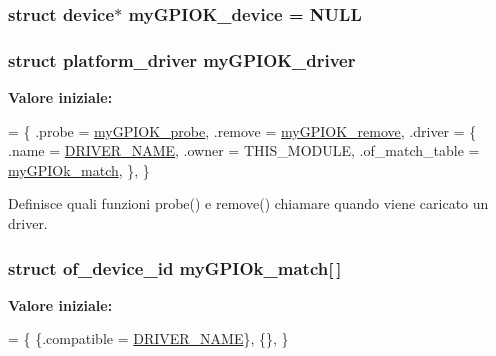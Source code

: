 \hypertarget{group___linux-_driver_ga2d345c792760e3103059b6b6e0bfdaee}{
\subsubsection[{my\+G\+P\+I\+O\+K\+\_\+device}]{\setlength{\rightskip}{0pt plus 5cm}struct device$\ast$ my\+G\+P\+I\+O\+K\+\_\+device = N\+U\+L\+L\hspace{0.3cm}{\ttfamily [static]}}}\label{group___linux-_driver_ga2d345c792760e3103059b6b6e0bfdaee}
\hypertarget{group___linux-_driver_ga8dba1541b58fa63f8208232ffce4fc47}{
\subsubsection[{my\+G\+P\+I\+O\+K\+\_\+driver}]{\setlength{\rightskip}{0pt plus 5cm}struct platform\+\_\+driver my\+G\+P\+I\+O\+K\+\_\+driver\hspace{0.3cm}{\ttfamily [static]}}}\label{group___linux-_driver_ga8dba1541b58fa63f8208232ffce4fc47}
{\bfseries Valore iniziale\+:}
\begin{DoxyCode}
= \{
        .probe = \hyperlink{group___linux-_driver_gae40973a06d72f7c41a9af07513a62307}{myGPIOK\_probe},
        .remove = \hyperlink{group___linux-_driver_ga59fddfaa36dea357f4bbdfceb0f47f8c}{myGPIOK\_remove},
        .driver = \{
                .name = \hyperlink{group___linux-_driver_ga25634d21648ca7fb7a2aca614bafaaeb}{DRIVER\_NAME},
                .owner = THIS\_MODULE,
                .of\_match\_table = \hyperlink{group___linux-_driver_ga91f28437e0a553effa546d16fa44f03a}{myGPIOk\_match},
        \},
\}
\end{DoxyCode}


Definisce quali funzioni probe() e remove() chiamare quando viene caricato un driver. 

\hypertarget{group___linux-_driver_ga91f28437e0a553effa546d16fa44f03a}{
\subsubsection[{my\+G\+P\+I\+Ok\+\_\+match}]{\setlength{\rightskip}{0pt plus 5cm}struct of\+\_\+device\+\_\+id my\+G\+P\+I\+Ok\+\_\+match\mbox{[}$\,$\mbox{]}\hspace{0.3cm}{\ttfamily [static]}}}\label{group___linux-_driver_ga91f28437e0a553effa546d16fa44f03a}
{\bfseries Valore iniziale\+:}
\begin{DoxyCode}
= \{
        \{.compatible = \hyperlink{group___linux-_driver_ga25634d21648ca7fb7a2aca614bafaaeb}{DRIVER\_NAME}\},
        \{\},
\}
\end{DoxyCode}


